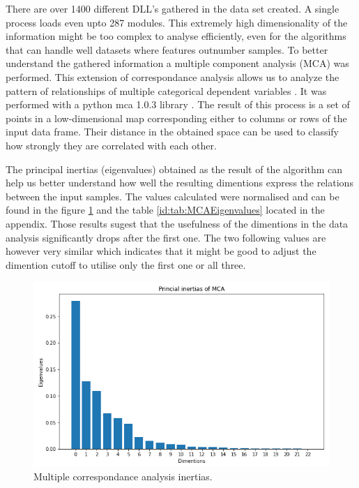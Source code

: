 \documentclass[a4paper,twoside,12pt]{book}
\begin{document}
There are over 1400 different DLL's gathered in the data set created. A single process loads 
even upto 287 modules. This extremely high dimensionality of the information might be too complex 
to analyse efficiently, even for the algorithms that can handle well datasets where features 
outnumber samples. To better understand the gathered information a multiple component 
analysis (MCA) was performed. This extension of correspondance analysis allows us to analyze the 
pattern of relationships of multiple categorical dependent variables \cite{bib:mca}. It was performed 
with a python mca 1.0.3 library \cite{bib:pymca}. The result of this process is a set of points in a 
low-dimensional map corresponding either to columns or rows of the input data frame. Their 
distance in the obtained space can be used to classify how strongly they are correlated with 
each other. 

The principal inertias (eigenvalues) obtained as the result of the algorithm can help us better 
understand how well the resulting dimentions express the relations between the input samples. 
The values calculated were normalised and can be found in the figure \ref{fig:mcaInertias} and 
the table \ref{id:tab:MCAEigenvalues} located in the appendix. Those results sugest that the 
usefulness of the dimentions in the data analysis significantly drops after the first one. The two
following values are however very similar which indicates that it might be good to adjust the 
dimention cutoff to utilise only the first one or all three.


\begin{figure}
	\centering
	\includegraphics[scale=0.9]{images/MCAEigenvalues}
	\caption{Multiple correspondance analysis inertias.}
	\label{fig:mcaInertias}
 \end{figure}
\end{document}
